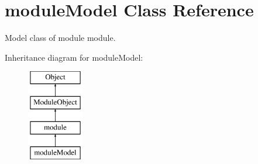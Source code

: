 \hypertarget{classmoduleModel}{\section{module\-Model Class Reference}
\label{classmoduleModel}
}


Model class of module module.  


Inheritance diagram for module\-Model\-:\begin{figure}[H]
\begin{center}
\leavevmode
\includegraphics[height=4.000000cm]{classmoduleModel}
\end{center}
\end{figure}
